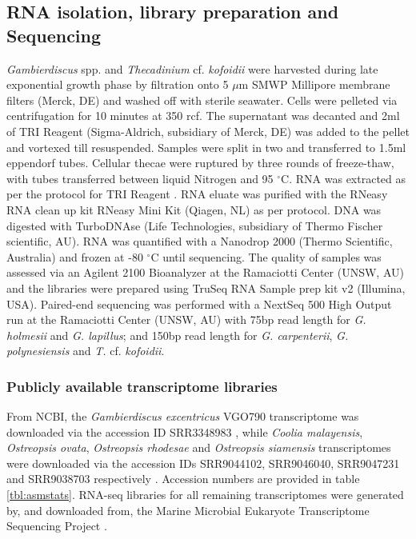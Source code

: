 \documentclass[fleqn,10pt,lineno]{wlpeerj} %
\begin{document}
\subsection*{RNA isolation, library preparation and Sequencing}
\emph{Gambierdiscus} spp. and \emph{Thecadinium} cf. \emph{kofoidii} were harvested during late exponential growth phase by filtration onto 5 $\mu$m SMWP Millipore membrane filters (Merck, DE) and washed off with sterile seawater. 
Cells were pelleted via centrifugation for 10 minutes at 350 rcf. 
The supernatant was decanted and 2ml of TRI Reagent (Sigma-Aldrich, subsidiary of Merck, DE) was added to the pellet and vortexed till resuspended. 
Samples were split in two and transferred to 1.5ml eppendorf tubes. 
Cellular thecae were ruptured by three rounds of freeze-thaw, with tubes transferred between liquid Nitrogen and 95 $^{\circ}$C. 
RNA was extracted as per the protocol for TRI Reagent \citep{rio2010purification}.
RNA eluate was purified with the RNeasy RNA clean up kit RNeasy Mini Kit (Qiagen, NL) as per protocol. 
DNA was digested with TurboDNAse (Life Technologies, subsidiary of Thermo Fischer scientific, AU). 
RNA was quantified with a Nanodrop 2000 (Thermo Scientific, Australia) and frozen at -80 $^{\circ}$C until sequencing.
The quality of samples was assessed via an Agilent 2100 Bioanalyzer at the Ramaciotti Center (UNSW, AU) and the libraries were prepared using TruSeq RNA Sample prep kit v2 (Illumina, USA). 
Paired-end sequencing was performed with a NextSeq 500 High Output run at the Ramaciotti Center (UNSW, AU) with 75bp read length for \emph{G. holmesii} and \emph{G. lapillus}; and 150bp read length for \emph{G. carpenterii}, \emph{G. polynesiensis} and \emph{T.} cf. \emph{kofoidii}.

\subsubsection*{Publicly available transcriptome libraries}
From NCBI, the \emph{Gambierdiscus excentricus} VGO790 transcriptome was downloaded via the accession ID SRR3348983 \citep{kohli2017role}, while \textit{Coolia malayensis}, \textit{Ostreopsis ovata}, \textit{Ostreopsis rhodesae} and \textit{Ostreopsis siamensis} transcriptomes were downloaded via the accession IDs SRR9044102, SRR9046040, SRR9047231 and SRR9038703 respectively \citep{verma2018comparative}. 
Accession numbers are provided in table \ref{tbl:asmstats}. 
RNA-seq libraries for all remaining transcriptomes were generated by, and downloaded from, the Marine Microbial Eukaryote Transcriptome Sequencing Project \citep{keeling2014marine}.
\end{document}
